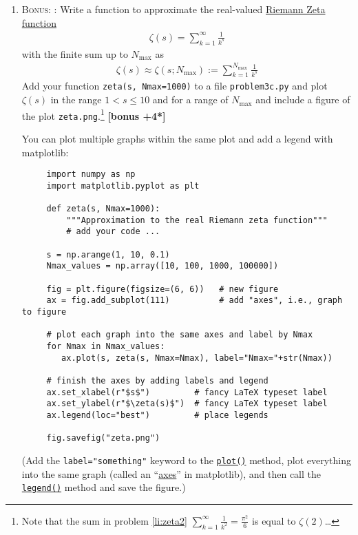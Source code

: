 \documentclass[letterpaper]{scrartcl}
\newcounter{TotalPoints}
\newcounter{TotalBonus}
\newcommand{\BONUS}{\textsc{Bonus: }}
\newcommand{\bonus}[1]{\textbf{[bonus +#1*]}\stepcounter{TotalBonus}}
\newcommand{\points}[1]{\textbf{[#1 points]}\stepcounter{TotalPoints}}
\newenvironment{enuma}{\begin{enumerate}[label=(\alph*)]}{\end{enumerate}}
\begin{document}
\begin{enuma}
\begin{gather}
    \label{eq:sum}
    S = \sqrt{\sum_{n=1}^{100} \frac{6}{n^{2}}}.
  \end{gather}
  Put your code into file \texttt{problem3b.py} and assign the result
  to a variable \texttt{mypi}. \points{2}
\item \label{li:zeta}\BONUS: Write a function to approximate the real-valued
  \href{http://mathworld.wolfram.com/RiemannZetaFunction.html}{Riemann
    Zeta function}
  \begin{gather}
    \label{eq:zeta}
    \zeta(s) = \sum_{k=1}^{\infty} \frac{1}{k^{s}}
  \end{gather}
  with the finite sum up to $N_{\text{max}}$ as
  \begin{gather}
    \label{eq:zetafinite}
    \zeta(s) \approx \zeta(s; N_{\text{max}}) := \sum_{k=1}^{N_{\text{max}}} \frac{1}{k^{s}}
  \end{gather}
  Add your function \texttt{zeta(s, Nmax=1000)} to a file
  \texttt{problem3c.py} and plot $\zeta(s)$ in the range
  $1 < s \leq 10$ and for a range of $N_{\text{max}}$ and include a
  figure of the plot \texttt{zeta.png}.\footnote{Note that the sum in
    problem \ref{li:zeta2}
    $\sum_{k=1}^{\infty} \frac{1}{k^{2}} = \frac{\pi^{2}}{6}$ is equal
    to $\zeta(2)$\dots} \bonus{4}
  
  You can plot multiple graphs within the same plot and add a legend
  with matplotlib:
  \begin{verbatim}
     import numpy as np 
     import matplotlib.pyplot as plt
     
     def zeta(s, Nmax=1000):
         """Approximation to the real Riemann zeta function"""
         # add your code ...

     s = np.arange(1, 10, 0.1)
     Nmax_values = np.array([10, 100, 1000, 100000])

     fig = plt.figure(figsize=(6, 6))   # new figure          
     ax = fig.add_subplot(111)          # add "axes", i.e., graph to figure

     # plot each graph into the same axes and label by Nmax
     for Nmax in Nmax_values:
        ax.plot(s, zeta(s, Nmax=Nmax), label="Nmax="+str(Nmax))

     # finish the axes by adding labels and legend
     ax.set_xlabel(r"$s$")         # fancy LaTeX typeset label
     ax.set_ylabel(r"$\zeta(s)$")  # fancy LaTeX typeset label
     ax.legend(loc="best")         # place legends

     fig.savefig("zeta.png")
   \end{verbatim}
  (Add the \texttt{label="something"} keyword to the
  \href{https://matplotlib.org/api/_as_gen/matplotlib.axes.Axes.plot.html#matplotlib.axes.Axes.plot}{\texttt{plot()}}
  method, plot everything into the same graph (called an
  ``\href{https://matplotlib.org/api/axes_api.html#axes-class}{axes}''
  in matplotlib), and then call the
  \href{https://matplotlib.org/api/_as_gen/matplotlib.axes.Axes.legend.html#matplotlib.axes.Axes.legend}{\texttt{legend()}}
  method and save the figure.)
\end{enuma}
\end{document}
